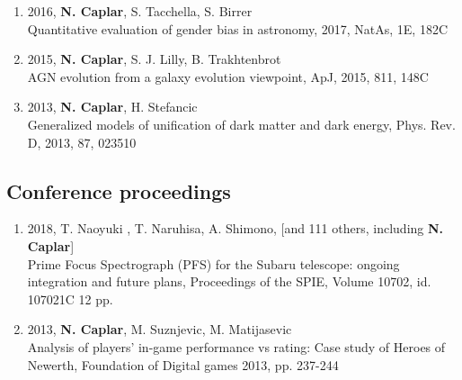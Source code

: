 \documentclass[11pt,letterpaper]{article}
\begin{document}
\begin{enumerate}
\item 2016, \textbf{N. Caplar}, S. Tacchella, S. Birrer \\ Quantitative evaluation of gender bias in astronomy,  2017, NatAs, 1E, 182C\\
 
\item 2015,  \textbf{N. Caplar}, S. J. Lilly, B. Trakhtenbrot  \\AGN evolution from a galaxy evolution viewpoint, ApJ,  2015, 811, 148C \\
  
 \item 2013,  \textbf{N. Caplar}, H. Stefancic  \\ Generalized models of unification of dark matter and dark energy, Phys. Rev. D, 2013, 87, 023510 \\


 
\end{enumerate}

\subsection*{Conference proceedings}
\begin{enumerate}
\item 2018, T. Naoyuki , T. Naruhisa,  A. Shimono, [and 111 others, including  \textbf{N. Caplar}] \\ Prime Focus Spectrograph (PFS) for the Subaru telescope: ongoing integration and future plans, Proceedings of the SPIE, Volume 10702, id. 107021C 12 pp. 

\item 2013,  \textbf{N. Caplar}, M. Suznjevic, M. Matijasevic  \\ Analysis of players' in-game performance vs rating: Case study of Heroes of Newerth, Foundation of Digital games 2013,  pp. 237-244  

\end{enumerate}

\newpage 
\end{document}
